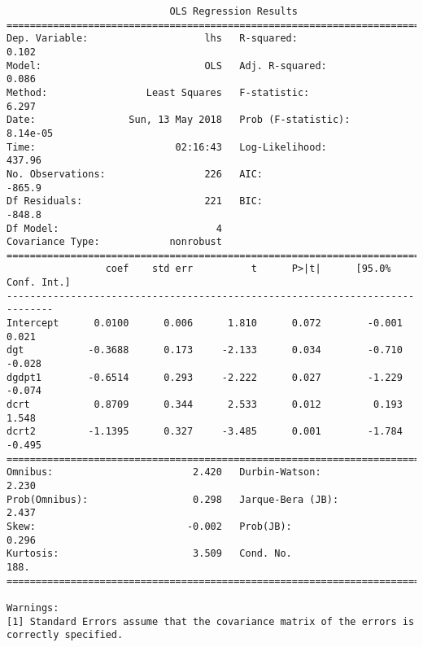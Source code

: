 \documentclass[12pt,fleqn]{article}\usepackage{../../common}
\begin{document}
\begin{verbatim}
                            OLS Regression Results                            
==============================================================================
Dep. Variable:                    lhs   R-squared:                       0.102
Model:                            OLS   Adj. R-squared:                  0.086
Method:                 Least Squares   F-statistic:                     6.297
Date:                Sun, 13 May 2018   Prob (F-statistic):           8.14e-05
Time:                        02:16:43   Log-Likelihood:                 437.96
No. Observations:                 226   AIC:                            -865.9
Df Residuals:                     221   BIC:                            -848.8
Df Model:                           4                                         
Covariance Type:            nonrobust                                         
==============================================================================
                 coef    std err          t      P>|t|      [95.0% Conf. Int.]
------------------------------------------------------------------------------
Intercept      0.0100      0.006      1.810      0.072        -0.001     0.021
dgt           -0.3688      0.173     -2.133      0.034        -0.710    -0.028
dgdpt1        -0.6514      0.293     -2.222      0.027        -1.229    -0.074
dcrt           0.8709      0.344      2.533      0.012         0.193     1.548
dcrt2         -1.1395      0.327     -3.485      0.001        -1.784    -0.495
==============================================================================
Omnibus:                        2.420   Durbin-Watson:                   2.230
Prob(Omnibus):                  0.298   Jarque-Bera (JB):                2.437
Skew:                          -0.002   Prob(JB):                        0.296
Kurtosis:                       3.509   Cond. No.                         188.
==============================================================================

Warnings:
[1] Standard Errors assume that the covariance matrix of the errors is correctly specified.
\end{verbatim}
\end{document}
